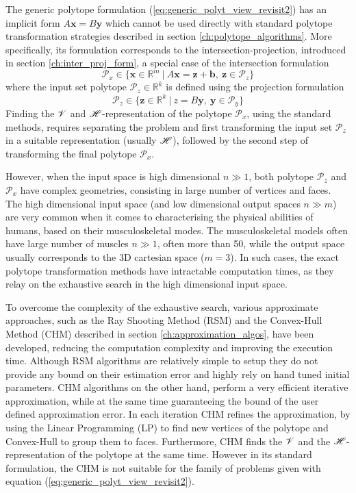 The generic polytope formulation (\ref{eq:generic_polyt_view_revisit2}) has an implicit form $A\bm{x}=B\bm{y}$ which cannot be used directly with standard polytope transformation strategies described in section \ref{ch:polytope_algorithms}. More specifically, its formulation corresponds to the intersection-projection, introduced in section \ref{ch:inter_proj_form}, a special case of the intersection formulation 
\begin{equation}
    \mathcal{P}_x \in \{\bm{x}\in \mathbb{R}^m~|~A \bm{x} = \bm{z} + \bm{b},~ \bm{z} \in \mathcal{P}_z\} 
\end{equation}
where the input set polytope $\mathcal{P}_z\in\mathbb{R}^k$ is defined using the projection formulation
\begin{equation}
    \mathcal{P}_z \in \{\bm{z}\in \mathbb{R}^k~|~z = B\bm{y},~ \bm{y} \in \mathcal{P}_y\} 
\end{equation}
Finding the $\mathscr{V}$ and $\mathscr{H}$-representation of the polytope $\mathcal{P}_x$, using the standard methods, requires separating the problem and first transforming the input set $\mathcal{P}_z$ in a suitable representation (usually $\mathscr{H}$), followed by the second step of transforming the final polytope $\mathcal{P}_x$. 

However, when the input space is high dimensional $n\gg1$, both polytope $\mathcal{P}_z$ and $\mathcal{P}_x$ have complex geometries, consisting in large number of vertices and faces. The high dimensional input space (and low dimensional output spaces $n\gg m$) are very common when it comes to characterising the physical abilities of humans, based on their musculoskeletal modes. The musculoskeletal models often have large number of muscles $n\gg1$, often more than 50, while the output space usually corresponds to the 3D cartesian space ($m=3$). In such cases, the exact polytope transformation methods have intractable computation times, as they relay on the exhaustive search in the high dimensional input space.

To overcome the complexity of the exhaustive search, various approximate approaches, such as the Ray Shooting Method (RSM)  \cite{agarwal1993ray} and the Convex-Hull Method (CHM) \cite{lassez1992quantifier} described in section \ref{ch:approximation_algos}, have been developed, reducing the computation complexity and improving the execution time. 
Although RSM algorithms are relatively simple to setup they do not provide any bound on their estimation error and highly rely on hand tuned initial parameters. 
CHM \cite{lassez1992quantifier} algorithms on the other hand, perform a very efficient iterative approximation,  while at the same time guaranteeing the bound of the user defined approximation error. In each iteration CHM refines the approximation, by using the Linear Programming (LP) to find new vertices of the polytope and Convex-Hull to group them to faces. Furthermore, CHM finds the $\mathscr{V}$ and the $\mathscr{H}$-representation of the polytope at the same time. However in its standard formulation, the CHM is not suitable for the family of problems given with equation (\ref{eq:generic_polyt_view_revisit2}). 

